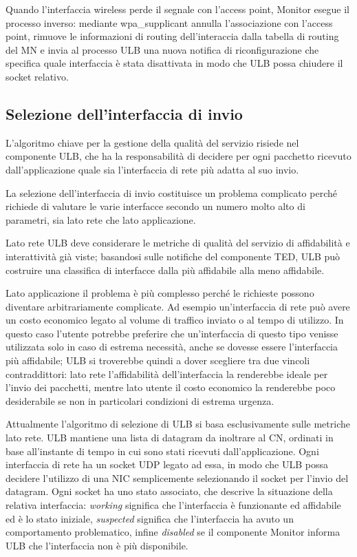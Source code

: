 \documentclass[12pt,a4paper,openright,twoside]{book}
\begin{document}
Quando l'interfaccia wireless perde il segnale con l'access point,
Monitor esegue il processo inverso: mediante wpa\_supplicant annulla
l'associazione con l'access point, rimuove le informazioni di routing
dell'interaccia dalla tabella di routing del MN e invia al processo
ULB una nuova notifica di riconfigurazione che specifica quale
interfaccia è stata disattivata in modo che ULB possa chiudere il
socket relativo.

\subsection{Selezione dell'interfaccia di invio}
\label{abps:scelta-nic}

L'algoritmo chiave per la gestione della qualità del servizio risiede
nel componente ULB, che ha la responsabilità di decidere per ogni
pacchetto ricevuto dall'applicazione quale sia l'interfaccia di rete
più adatta al suo invio.

La selezione dell'interfaccia di invio costituisce un problema
complicato perché richiede di valutare le varie interfacce secondo un
numero molto alto di parametri, sia lato rete che lato applicazione.

Lato rete ULB deve considerare le metriche di qualità del servizio di
affidabilità e interattività già viste; basandosi sulle notifiche del
componente TED, ULB può costruire una classifica di interfacce dalla
più affidabile alla meno affidabile.

Lato applicazione il problema è più complesso perché le richieste
possono diventare arbitrariamente complicate. Ad esempio
un'interfaccia di rete può avere un costo economico legato al volume
di traffico inviato o al tempo di utilizzo. In questo caso l'utente
potrebbe preferire che un'interfaccia di questo tipo venisse
utilizzata solo in caso di estrema necessità, anche se dovesse essere
l'interfaccia più affidabile; ULB si troverebbe quindi a dover
scegliere tra due vincoli contraddittori: lato rete l'affidabilità
dell'interfaccia la renderebbe ideale per l'invio dei pacchetti,
mentre lato utente il costo economico la renderebbe poco desiderabile
se non in particolari condizioni di estrema urgenza.

Attualmente l'algoritmo di selezione di ULB si basa esclusivamente
sulle metriche lato rete. ULB mantiene una lista di datagram da
inoltrare al CN, ordinati in base all'instante di tempo in cui sono
stati ricevuti dall'applicazione. Ogni interfaccia di rete ha un
socket UDP legato ad essa, in modo che ULB possa decidere l'utilizzo
di una NIC semplicemente selezionando il socket per l'invio del
datagram. Ogni socket ha uno stato associato, che descrive la
situazione della relativa interfaccia: \emph{working} significa che
l'interfaccia è funzionante ed affidabile ed è lo stato iniziale,
\emph{suspected} significa che l'interfaccia ha avuto un comportamento
problematico, infine \emph{disabled} se il componente Monitor informa
ULB che l'interfaccia non è più disponibile.
\end{document}
